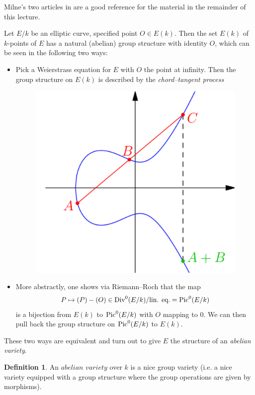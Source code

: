 \documentclass[12pt]{amsart}
\numberwithin{equation}{section}
\theoremstyle{remark}
\theoremstyle{definition}
\theoremstyle{definition}
\theoremstyle{definition}
\newtheorem{defi}[equation]{Definition}
\theoremstyle{definition}
\theoremstyle{definition}
\theoremstyle{definition}
\begin{document}
Milne's two articles in \cite{MR861969} are a good reference for the material in the remainder of this lecture.

Let $E/k$ be an elliptic curve, specified point $O\in E(k)$. Then the set $E(k)$ of $k$-points of $E$ has a natural (abelian) group structure with identity $O$, which can be seen in the following two ways:

\begin{itemize}
\item Pick a Weierstrass equation for $E$ with $O$ the point at infinity. Then the group structure on $E(k)$ is described by the \textit{chord--tangent process}
\begin{figure} [!htb] 
\includegraphics[angle=0,scale=0.4]{ECgrouplaw}
\end{figure}
\item More abstractly, one shows via Riemann--Roch that the map
\[P\mapsto (P)-(O) \in \textup{Div}^0(E/k)/\textup{lin. eq.}=\textup{Pic}^0(E/k)\]
is a bijection from $E(k)$ to $\textup{Pic}^0(E/k)$ with $O$ mapping to $0$. We can then pull back the group structure on $\textup{Pic}^0(E/k)$ to $E(k)$. 
\end{itemize}

These two ways are equivalent and turn out to give $E$ the structure of an \textit{abelian variety}. 

\begin{defi}
An $\textit{abelian variety}$ over $k$ is a nice group variety (i.e. a nice variety equipped with a group structure where the group operations are given by  morphisms).
\end{defi}
\end{document}
